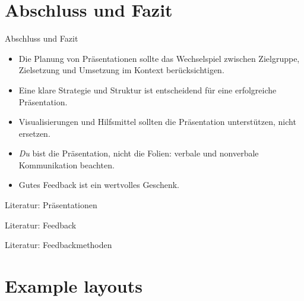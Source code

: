 \documentclass[aspectratio=\BeamerAspectRatio]{beamer}
\begin{document}
\section{Abschluss und Fazit}
\begin{frame}{Abschluss und Fazit}
\begin{itemize}
  \item<1-> Die Planung von Präsentationen sollte das Wechselspiel zwischen Zielgruppe, Zielsetzung und Umsetzung im Kontext berücksichtigen.
  \item<2-> Eine klare Strategie und Struktur ist entscheidend für eine erfolgreiche Präsentation.
  \item<3-> Visualisierungen und Hilfsmittel sollten die Präsentation unterstützen, nicht ersetzen.
  \item<4-> \textit{Du} bist die Präsentation, nicht die Folien: verbale und nonverbale Kommunikation beachten.
  \item<5-> Gutes Feedback ist ein wertvolles Geschenk.
\end{itemize}

\end{frame}

\begin{frame}{Literatur: Präsentationen}
  \footnotesize
  \nocite{noetel2022,fiorella2021,agarwal2021,yates2002,10.3389/fpsyg.2019.03087,brandmo2025,roehl2025,levinielsen2026}
  \printbibliography[heading=none,keyword=presentation]
\end{frame}

\begin{frame}{Literatur: Feedback}
  \footnotesize
  \printbibliography[heading=none,keyword=learningfeedback]
\end{frame}

\begin{frame}{Literatur: Feedbackmethoden}
  \footnotesize
  \nocite{meyer2018,schuelerakademien2016,projectzeroLadder,lerman2020,sargeant2017}
  \setlength{\bibitemsep}{3pt}
  \printbibliography[heading=none,keyword=feedbackmethod]
\end{frame}

\appendix
\section{Example layouts}
\end{document}
